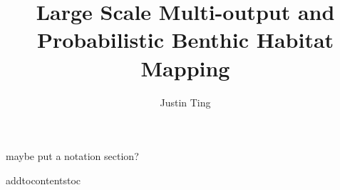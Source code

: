 \documentclass{usydthesis}
\title{{\bf\Huge Large Scale Multi-output and Probabilistic Benthic Habitat Mapping}}
\author{Justin Ting}
\theoremstyle{definition}
\newcommand{\todo}[1]{{\color{red} #1}}
\renewcommand{\thepage}{\roman{page}}
\begin{document}
\maketitle


\cleardoublepage
{}

\cleardoublepage
{}

\cleardoublepage
{}


\cleardoublepage
\setcounter{tocdepth}{2}
\setcounter{secnumdepth}{4}
\tableofcontents

{\makeatletter
\renewcommand*\numberline[1]{\hb@xt@\@tempdima{#1 \hfil}\hspace*{1em}}
\makeatother
\cleardoublepage
}

\setcounter{page}{1}
\setcounter{chapter}{0}

\renewcommand{\thepage}{\arabic{page}}	
\setupParagraphs

\todo{maybe put a notation section?}











{
\cleardoublepage
{}

}

\appendix
addtocontents{toc}{\protect\setcounter{tocdepth}{1}}
% 

\end{document}
